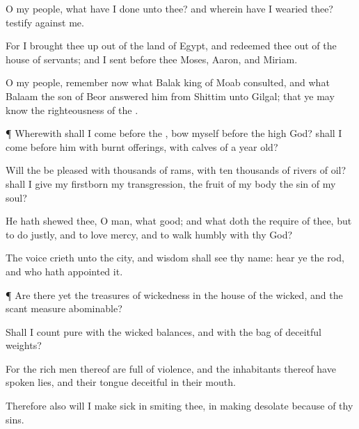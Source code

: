 {O my
people, what have I
done unto thee? and wherein have I
wearied thee?
testify against me.

For I brought thee
up out of the
land of
Egypt, and
redeemed thee out of the
house of
servants; and I
sent
before thee
Moses,
Aaron, and
Miriam.

O my
people,
remember now what
Balak
king of
Moab
consulted, and what
Balaam the
son of
Beor
answered him from
Shittim unto
Gilgal; that ye may
know the
righteousness of the
{}.


\par }{\PP {}¶ Wherewith shall I come
before the
{},
{}
bow myself before the
high
God? shall I come
before him with burnt
offerings, with
calves of a
year
old?

Will the
{} be
pleased with
thousands of
rams,
{} with ten
thousands of
rivers of
oil? shall I
give my
firstborn
{} my
transgression, the
fruit of my
body
{} the
sin of my
soul?

He hath
shewed thee, O
man, what
{}
good; and what doth the
{}
require of thee, but to
do
justly, and to
love
mercy, and to
walk
humbly with thy
God?


\par }{\PP {}The
{}
voice
crieth unto the
city, and
{}
wisdom shall
see thy
name:
hear ye the
rod, and who hath
appointed it.


\par }{\PP {}¶ Are
there yet the
treasures of
wickedness in the
house of the
wicked, and the
scant
measure
{}
abominable?

Shall I count
{}
pure with the
wicked
balances, and with the
bag of
deceitful
weights?

For the rich
men thereof are
full of
violence, and the
inhabitants thereof have
spoken
lies, and their
tongue
{}
deceitful in their
mouth.

Therefore also will I make
{}
sick in
smiting thee, in making
{}
desolate because of thy
sins.

}
